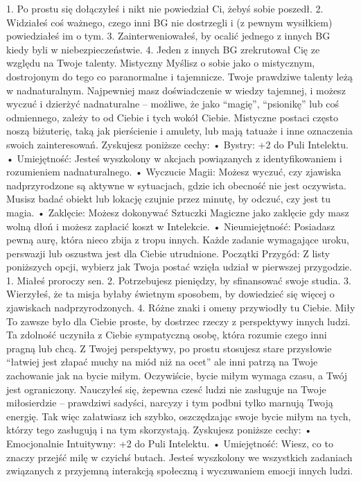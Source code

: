 1. Po prostu się dołączyłeś i nikt nie powiedział Ci, żebyś sobie poszedł.
2. Widziałeś coś ważnego, czego inni BG nie dostrzegli i (z pewnym wysiłkiem) powiedziałeś im o tym.
3. Zainterweniowałeś, by ocalić jednego z innych BG kiedy byli w niebezpieczeństwie.
4. Jeden z innych BG zrekrutował Cię ze względu na Twoje talenty.
Mistyczny
Myślisz o sobie jako o mistycznym, dostrojonym do tego co paranormalne i tajemnicze. Twoje prawdziwe talenty leżą w nadnaturalnym.  Najpewniej masz doświadczenie w wiedzy tajemnej, i możesz wyczuć i dzierżyć nadnaturalne – możliwe, że jako “magię”, “psionikę” lub coś odmiennego, zależy to od Ciebie i tych wokół Ciebie. Mistyczne postaci często noszą biżuterię, taką jak pierścienie i amulety, lub mają tatuaże i inne oznaczenia swoich zainteresowań.
Zyskujesz poniższe cechy:
    • Bystry: +2 do Puli Intelektu.
    • Umiejętność: Jesteś wyszkolony w akcjach powiązanych z identyfikowaniem i rozumieniem nadnaturalnego.
    • Wyczucie Magii: Możesz wyczuć, czy zjawiska nadprzyrodzone są aktywne w sytuacjach, gdzie ich obecność nie jest oczywista. Musisz badać obiekt lub lokację czujnie przez minutę, by odczuć, czy jest tu magia. 
    • Zaklęcie: Możesz dokonywać Sztuczki Magiczne jako zaklęcie gdy masz wolną dłoń i możesz zapłacić koszt w Intelekcie. 
    • Nieumiejętność: Posiadasz pewną aurę, która nieco zbija z tropu innych. Każde zadanie wymagające uroku, perswazji lub oszustwa jest dla Ciebie utrudnione. 
Początki Przygód: Z listy poniższych opcji, wybierz jak Twoja postać wzięła udział w pierwszej przygodzie.
1. Miałeś proroczy sen.
2. Potrzebujesz pieniędzy, by sfinansować swoje studia.
3. Wierzyłeś, że ta misja byłaby świetnym sposobem, by dowiedzieć się więcej o zjawiskach nadprzyrodzonych.
4. Różne znaki i omeny przywiodły tu Ciebie.
Miły
To zawsze było dla Ciebie proste, by dostrzec rzeczy z perspektywy innych ludzi. Ta zdolność uczyniła z Ciebie sympatyczną osobę, która rozumie czego inni pragną lub chcą. Z Twojej perspektywy, po prostu stosujesz stare przysłowie “łatwiej jest złapać muchy na miód niż na ocet” ale inni patrzą na Twoje zachowanie jak na bycie miłym. Oczywiście, bycie miłym wymaga czasu, a Twój jest ograniczony. Nauczyłeś się, żepewna czesć ludzi nie zasługuje na Twoje miłosierdzie – prawdziwi sadyści, narcyzy i tym podbni tylko marnują Twoją energię. Tak więc załatwiasz ich szybko, oszczędzając swoje bycie miłym na tych, którzy tego zasługują i na tym skorzystają. 
Zyskujesz poniższe cechy:
    • Emocjonalnie Intuitywny: +2 do Puli Intelektu.
    • Umiejętność: Wiesz, co to znaczy przejść milę w czyichś butach. Jesteś wyszkolony we wszystkich zadaniach związanych z przyjemną interakcją społeczną i wyczuwaniem emocji innych ludzi.
